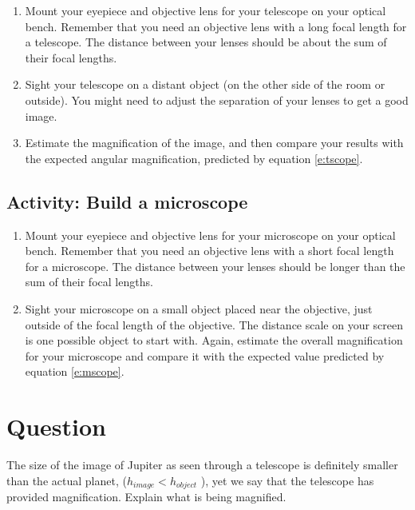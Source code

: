\begin{enumerate}
	\item Mount your eyepiece and objective lens for your telescope on your optical bench. Remember that you need an objective lens with a long focal length for a telescope. The distance between your lenses should be about the sum of their focal lengths.
	\item Sight your telescope on a distant object (on the other side of the room or outside). You might need to adjust the separation of your lenses to get a good image. 
	\item Estimate the magnification of the image, and then compare your results with the expected angular magnification, predicted by equation \ref{e:tscope}.
\end{enumerate}

\subsection{Activity: Build a microscope}

\begin{enumerate}
	\item Mount your eyepiece and objective lens for your microscope on your optical bench. Remember that you need an objective lens with a short focal length for a microscope. The distance between your lenses should be longer than the sum of their focal lengths.
	\item Sight your microscope on a small object placed near the objective, just outside of the focal length of the objective. The distance scale on your screen is one possible object to start with. Again, estimate the overall magnification for your microscope and compare it with the expected value predicted by equation \ref{e:mscope}.
\end{enumerate}

\section{Question} 
The size of the image of Jupiter as seen through a telescope is definitely
smaller than the actual planet, ($h_{image} < h_{object}$ ), yet we say that the telescope has provided magnification. Explain what is being magnified.
 
\endinput
